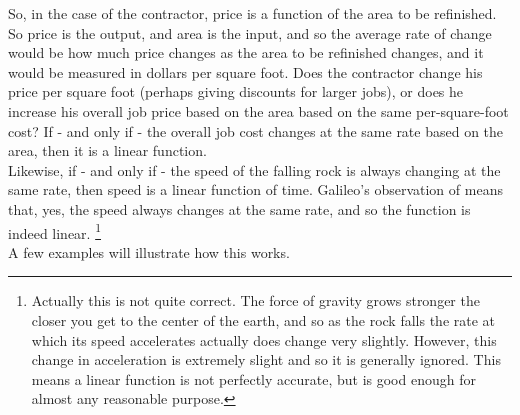 So, in the case of the contractor, price is a function of the area to be refinished. So price is the output, and area is the input, and so the average rate of change would be how much price changes as the area to be refinished changes, and it would be measured in dollars per square foot. Does the contractor change his price per square foot (perhaps giving discounts for larger jobs), or does he increase his overall job price based on the area based on the same per-square-foot cost? If - and only if - the overall job cost changes at the same rate based on the area, then it is a linear function.\\
Likewise, if - and only if - the speed of the falling rock is always changing at the same rate, then speed is a linear function of time. Galileo’s observation of  means that, yes, the speed always changes at the same rate, and so the function is indeed linear.
\footnote{Actually this is not quite correct. The force of gravity grows stronger the closer you get to the center of the earth, and so as the rock falls the rate at which its speed accelerates actually does change very slightly. However, this change in acceleration is extremely slight and so it is generally ignored. This means a linear function is not perfectly accurate, but is good enough for almost any reasonable purpose.}\\

A few examples will illustrate how this works.




